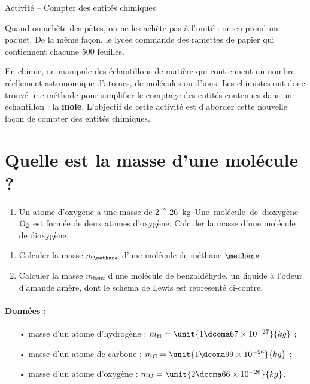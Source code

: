 \documentclass[12pt,a4paper,fleqn]{article}
\newcommand{\ritem}{\refstepcounter{enumi}\item[$\star$ \theenumi .]}
\begin{document}
\begin{header}
Activité -- Compter des entités chimiques
\end{header}

Quand on achète des pâtes, on ne les achète pas à l'unité : on en prend un paquet.
De la même façon, le lycée commande des ramettes de papier qui contiennent chacune 500 feuilles.

En chimie, on manipule des échantillons de matière qui contiennent un nombre réellement astronomique d'atomes, de molécules ou d'ions.
Les chimistes ont donc trouvé une méthode pour simplifier le comptage des entités contenues dans un échantillon : la \textbf{mole}.
L'objectif de cette activité est d'aborder cette nouvelle façon de compter des entités chimiques.

\section*{Quelle est la masse d'une molécule ?}

\begin{enumerate}
\item Un atome d'oxygène a une masse de \unit{2  ^{-26}}{kg}.
Une molécule de dioxygène $\text{O}_\text{2}$ est formée de deux atomes d'oxygène.
Calculer la masse d'une molécule de dioxygène.
\end{enumerate}
\begin{multicols}{2}
\begin{enumerate}[resume]
\item Calculer la masse $m_\methane$ d'une molécule de méthane $\methane$.

\ritem Calculer la masse $m_\mathrm{benz}$ d'une molécule de benzaldéhyde, un liquide à l'odeur d'amande amère, dont le schéma de Lewis est représenté ci-contre.
\end{enumerate}

\begin{center}
\end{center}
\end{multicols}

\paragraph{Données :}
\begin{itemize}
\item[•] masse d'un atome d'hydrogène : $m_\mathrm{H} = \unit{1\dcoma 67 \times 10 ^{-27}}{kg}$ ;
\item[•] masse d'un atome de carbone : $m_\mathrm{C} = \unit{1\dcoma 99 \times 10 ^{-26}}{kg}$ ;
\item[•] masse d'un atome d'oxygène : $m_\mathrm{O} = \unit{2\dcoma 66 \times 10 ^{-26}}{kg}$.
\end{itemize}
\end{document}
